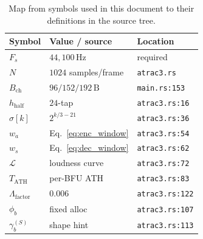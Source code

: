 \documentclass[11pt]{article}
\begin{document}
\begin{table}[ht]
\centering\small
\begin{tabular}{lll}
\toprule
Symbol & Value / source & Location \\
\midrule
\(F_s\) & \(44{,}100\,\text{Hz}\) & required \\
\(N\)   & \(1024\) samples/frame  & \texttt{atrac3.rs} \\
\(B_{\text{ch}}\) & \(96/152/192\,\text{B}\) & \texttt{main.rs:153} \\
\(h_{\text{half}}\) & \(24\)-tap & \texttt{atrac3.rs:16} \\
\(\sigma[k]\) & \(2^{k/3 - 21}\) & \texttt{atrac3.rs:36} \\
\(w_a\) & Eq.~\ref{eq:enc_window} & \texttt{atrac3.rs:54} \\
\(w_s\) & Eq.~\ref{eq:dec_window} & \texttt{atrac3.rs:62} \\
\(\mathcal{L}\) & loudness curve & \texttt{atrac3.rs:72} \\
\(T_{\text{ATH}}\) & per-BFU ATH & \texttt{atrac3.rs:83} \\
\(\Lambda_{\text{factor}}\) & \(0.006\) & \texttt{atrac3.rs:122} \\
\(\phi_b\) & fixed alloc & \texttt{atrac3.rs:107} \\
\(\gamma_b^{(S)}\) & shape hint & \texttt{atrac3.rs:113} \\
\bottomrule
\end{tabular}
\caption{Map from symbols used in this document to their definitions in
the source tree.}
\label{tab:constants}
\end{table}
\end{document}
